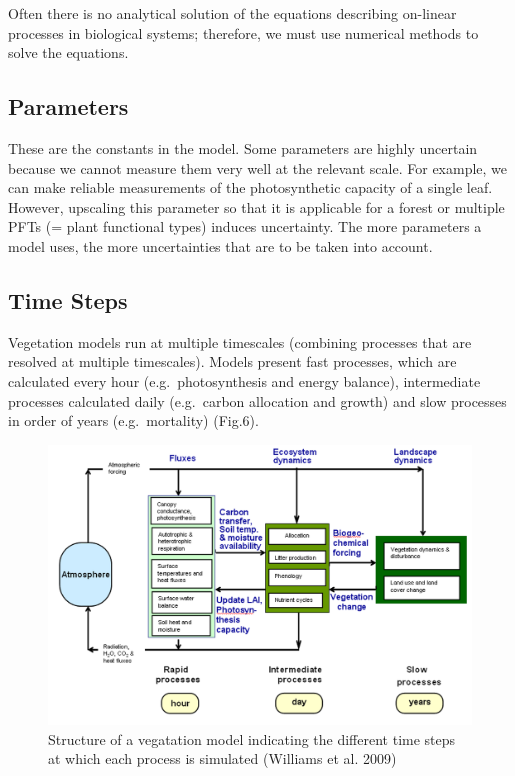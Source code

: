 \documentclass[12pt,oneside]{book}
\begin{document}
Often there is no analytical solution of the equations describing
on-linear processes in biological systems; therefore, we must use
numerical methods to solve the equations.

\subsection{Parameters}\label{parameters}

These are the constants in the model. Some parameters are highly
uncertain because we cannot measure them very well at the relevant
scale. For example, we can make reliable measurements of the
photosynthetic capacity of a single leaf. However, upscaling this
parameter so that it is applicable for a forest or multiple PFTs (=
plant functional types) induces uncertainty. The more parameters a model
uses, the more uncertainties that are to be taken into account.

\subsection{Time Steps}\label{time-steps}

Vegetation models run at multiple timescales (combining processes that
are resolved at multiple timescales). Models present fast processes,
which are calculated every hour (e.g.~photosynthesis and energy
balance), intermediate processes calculated daily (e.g.~carbon
allocation and growth) and slow processes in order of years
(e.g.~mortality) (Fig.6).

\begin{figure}

{\centering \includegraphics[width=0.8\linewidth]{figures/chap1/time_steps} 

}

\caption{Structure of a vegatation model indicating the different time steps at which each process is simulated (Williams et al. 2009)}\label{fig:f9}
\end{figure}
\end{document}
